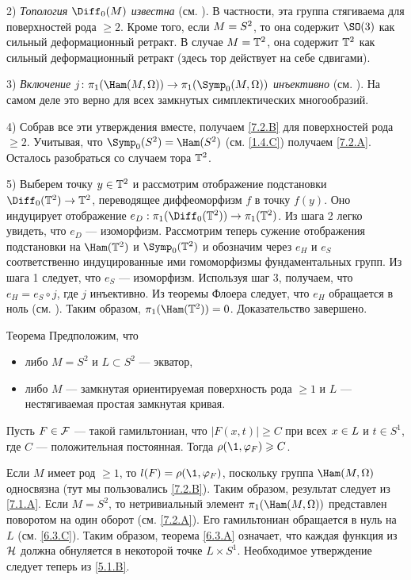 2) \textit{Топология $\Diff_0 (M)$ известна} (см. \cite{EE}).
В частности, эта группа стягиваема для поверхностей рода $\ge 2$.
Кроме того, если $M \z= S^2$, то она содержит $\SO (3)$ как сильный
деформационный ретракт. 
В случае $M = \mathbb{T}^2$, она содержит $\mathbb{T}^2$ как сильный деформационный
ретракт (здесь тор действует на себе сдвигами). 

3) \textit{Включение $j\: \pi_1 (\Ham (M, \Omega)) \to \pi_1 (\Symp_0 (M,
\Omega))$ инъективно} (см. \cite[10.18 iii]{MS}). 
На самом деле это верно для всех замкнутых симплектических многообразий.

4) Собрав все эти утверждения вместе, получаем \ref{7.2.B} для
поверхностей рода $\ge 2$. 
Учитывая, что $\Symp_0 (S^2) = \Ham (S^2)$ (см. \ref{1.4.C}) получаем
\ref{7.2.A}. 
Осталось разобраться со случаем тора $\mathbb{T}^2$.

5) Выберем точку $y \in \mathbb{T}^2$ и рассмотрим отображение подстановки $\Diff_0 (\TT^2) \to \TT^2$,
переводящее диффеоморфизм $f$ в точку $f(y)$. 
Оно индуцирует отображение $e_D: \pi_1 (\Diff_0 (\TT^2)) \to \pi_1 (\TT^2)$.
Из шага 2 легко увидеть, что $e_D$ — изоморфизм.
Рассмотрим теперь сужение отображения подстановки на $\Ham (\TT^2)$ и
$\Symp_0 (\TT^2)$ и обозначим через $e_H$ и $e_S$ соответственно
индуцированные ими гомоморфизмы фундаментальных групп. 
Из шага 1 следует, что $e_S$ — изоморфизм.
Используя шаг 3, получаем, что $e_H = e_S \circ j$, где $j$ инъективно.
Из теоремы Флоера следует, что $e_H$ обращается в ноль (см. \cite{LMP1}).
Таким образом, $\pi_1 (\Ham (\TT^2)) = 0$. 
Доказательство завершено. 
\qeds

\begin{thm}[(\cite{P5})]{Теорема}\label{7.2.C}
Предположим, что 
\begin{itemize}
\item либо $M = S^2$ и $L \subset S^2$ — экватор, 
\item либо $M$ — замкнутая ориентируемая поверхность рода $\ge 1$ и
  $L$ — нестягиваемая простая замкнутая кривая. 
\end{itemize}
Пусть $F \in \mathcal{F}$ — такой гамильтониан, что $|F(x,t)| \ge C$ при всех $x \z\in L$ и $t \in S^1$, где $C$ — положительная постоянная.
Тогда $\rho (\1, \phi_F) \z\ge C$.
\end{thm}

Если $M$ имеет род $\ge 1$, то $l (F) = \rho (\1, \phi_F)$, поскольку группа $\Ham (M, \Omega)$ односвязна (тут мы пользовались \ref{7.2.B}).
Таким образом, результат следует из \ref{7.1.A}.
Если $M = S^2$, то нетривиальный элемент $\pi_1 (\Ham (M, \Omega))$ представлен поворотом на один оборот (см. \ref{7.2.A}).
Его гамильтониан обращается в нуль на $L$ (см. \ref{6.3.C}).
Таким образом, теорема \ref{6.3.A} означает, что каждая функция из $\mathcal{H}$ должна обнуляется в некоторой точке $L \times S^1$.
Необходимое утверждение следует теперь из \ref{5.1.B}.
\qeds

